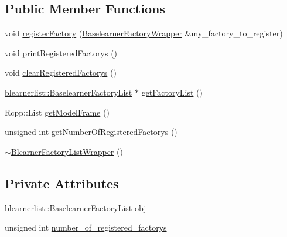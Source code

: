 \subsection*{Public Member Functions}
\begin{DoxyCompactItemize}
\item 
void \mbox{\hyperlink{class_blearner_factory_list_wrapper_a672ddef75775ba1d5f930a20a9027247}{register\+Factory}} (\mbox{\hyperlink{class_baselearner_factory_wrapper}{Baselearner\+Factory\+Wrapper}} \&my\+\_\+factory\+\_\+to\+\_\+register)
\item 
void \mbox{\hyperlink{class_blearner_factory_list_wrapper_a53be3f4546c996827d03db1f637d2066}{print\+Registered\+Factorys}} ()
\item 
void \mbox{\hyperlink{class_blearner_factory_list_wrapper_a290316574cfb239214256f8f3610d475}{clear\+Registered\+Factorys}} ()
\item 
\mbox{\hyperlink{classblearnerlist_1_1_baselearner_factory_list}{blearnerlist\+::\+Baselearner\+Factory\+List}} $\ast$ \mbox{\hyperlink{class_blearner_factory_list_wrapper_a985fa4f35e74e44cd91567fb14d575ab}{get\+Factory\+List}} ()
\item 
Rcpp\+::\+List \mbox{\hyperlink{class_blearner_factory_list_wrapper_ae6cfdabc3dfe85a90a1c6eb5620edeb9}{get\+Model\+Frame}} ()
\item 
unsigned int \mbox{\hyperlink{class_blearner_factory_list_wrapper_ad497952e0c045016b70b94d06a713b44}{get\+Number\+Of\+Registered\+Factorys}} ()
\item 
\mbox{\hyperlink{class_blearner_factory_list_wrapper_a017a8b4de8aa52676acc6a03949d6a92}{$\sim$\+Blearner\+Factory\+List\+Wrapper}} ()
\end{DoxyCompactItemize}
\subsection*{Private Attributes}
\begin{DoxyCompactItemize}
\item 
\mbox{\hyperlink{classblearnerlist_1_1_baselearner_factory_list}{blearnerlist\+::\+Baselearner\+Factory\+List}} \mbox{\hyperlink{class_blearner_factory_list_wrapper_a3c9f95887bc2c583c120d01efc2e69b2}{obj}}
\item 
unsigned int \mbox{\hyperlink{class_blearner_factory_list_wrapper_a542631415e4d7c3621a3701c951c4797}{number\+\_\+of\+\_\+registered\+\_\+factorys}}
\end{DoxyCompactItemize}


